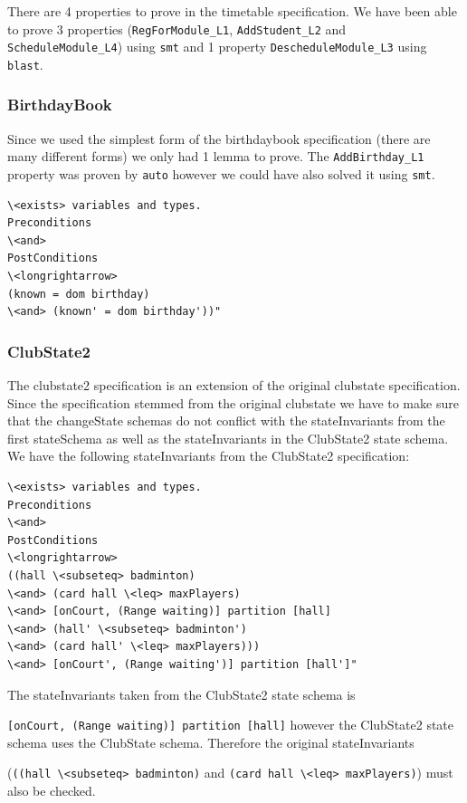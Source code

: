 There are 4 properties to prove in the timetable specification. We have been
able to prove 3 properties (\verb|RegForModule_L1|, \verb|AddStudent_L2| and
\verb|ScheduleModule_L4|) using \verb|smt| and 1 property
\verb|DescheduleModule_L3| using \verb|blast|.

\subsubsection{BirthdayBook}

Since we used the simplest form of the birthdaybook specification (there are
many different forms) we only had 1 lemma to prove. The \verb|AddBirthday_L1|
property was proven by \verb|auto| however we could have also solved it using
\verb|smt|.

\begin{verbatim}
\<exists> variables and types.
Preconditions
\<and>
PostConditions
\<longrightarrow>
(known = dom birthday)
\<and> (known' = dom birthday'))"
\end{verbatim}

\subsubsection{ClubState2}

The clubstate2 specification is an extension of the original clubstate
specification. Since the specification stemmed from the original clubstate we
have to make sure that the changeState schemas do not conflict with the
stateInvariants from the first stateSchema as well as the stateInvariants in the
ClubState2 state schema. We have the following stateInvariants from the
ClubState2 specification:

\begin{verbatim}
\<exists> variables and types.
Preconditions
\<and>
PostConditions
\<longrightarrow>
((hall \<subseteq> badminton)
\<and> (card hall \<leq> maxPlayers)
\<and> [onCourt, (Range waiting)] partition [hall]
\<and> (hall' \<subseteq> badminton')
\<and> (card hall' \<leq> maxPlayers)))
\<and> [onCourt', (Range waiting')] partition [hall']"
\end{verbatim}

The stateInvariants taken from the ClubState2 state schema is

 \verb|[onCourt, (Range waiting)] partition [hall]| however the ClubState2 state
 schema uses the ClubState schema. Therefore the original stateInvariants

(\verb|((hall \<subseteq> badminton)| and \verb|(card hall \<leq> maxPlayers)|)
must also be checked.

